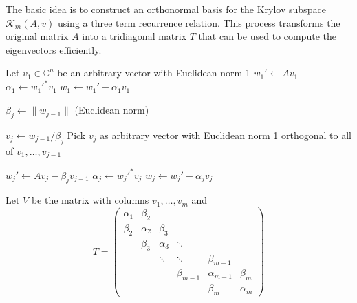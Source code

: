   \begin{algo} 
    The basic idea is to construct an orthonormal basis for the \hyperref[def:krylov-subspace]{Krylov subspace} $\mathcal{K}_m (A, v)$ using a three term recurrence relation. This process transforms the original matrix $A$ into a tridiagonal matrix $T$ that can be used to compute the eigenvectors efficiently.  
    
    \begin{algorithm}[H]
      \caption{Lanczos Algorithm}
      \label{alg:lanczos}
      \begin{algorithmic}[1]
            
        
        \State Let $v_1 \in \mathbb{C}^n$ be an arbitrary vector with Euclidean norm 1
        \State $w_1' \gets A v_1$
        \State $\alpha_1 \gets {w_1'}^* v_1$
        \State $w_1 \gets w_1' - \alpha_1 v_1$
        
          \State $\beta_j \gets \|w_{j-1}\|$ (Euclidean norm)
          
            \State $v_j \gets w_{j-1} / \beta_j$
          \Else
            \State Pick $v_j$ as arbitrary vector with Euclidean norm 1 orthogonal to all of $v_1, \ldots, v_{j-1}$
          \EndIf
          
          \State $w_j' \gets A v_j - \beta_j v_{j-1}$
          \State $\alpha_j \gets {w_j'}^* v_j$
          \State $w_j \gets w_j' - \alpha_j v_j$
        \EndFor
        
        \State Let $V$ be the matrix with columns $v_1, \ldots, v_m$ and 
        \begin{equation}
          T = \begin{pmatrix}
            \alpha_1 & \beta_2 & & & \\
            \beta_2 & \alpha_2 & \beta_3 & & \\
            & \beta_3 & \alpha_3 & \ddots & \\
            & & \ddots & \ddots & \beta_{m-1} \\
            & & & \beta_{m-1} & \alpha_{m-1} & \beta_m \\
            & & & & \beta_m & \alpha_m
          \end{pmatrix}
        \end{equation}
        

\end{algorithmic}
\end{algorithm}
\end{algo}
